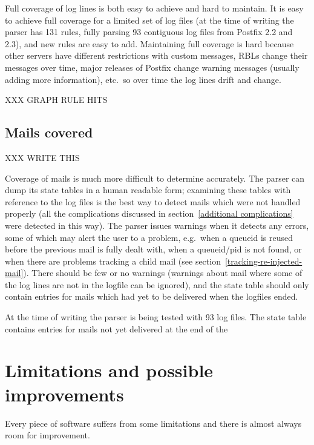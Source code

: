\documentclass[a4paper,12pt,draft]{article}
\begin{document}
Full coverage of log lines is both easy to achieve and hard to maintain.
It is easy to achieve full coverage for a limited set of log files (at the
time of writing the parser has 131 rules, fully parsing 93 contiguous log
files from Postfix 2.2 and 2.3), and new rules are easy to add.
Maintaining full coverage is hard because other servers have different
restrictions with custom messages, RBLs change their messages over time,
major releases of Postfix change warning messages (usually adding more
information), etc.\ so over time the log lines drift and change.

XXX GRAPH RULE HITS

\subsection{Mails covered}

\label{mails-covered}

XXX WRITE THIS

Coverage of mails is much more difficult to determine accurately.  The
parser can dump its state tables in a human readable form; examining these
tables with reference to the log files is the best way to detect mails
which were not handled properly (all the complications discussed in
section~\ref{additional complications} were detected in this way).  The
parser issues warnings when it detects any errors, some of which may alert
the user to a problem, e.g.\ when a queueid is reused before the previous
mail is fully dealt with, when a queueid/pid is not found, or when there
are problems tracking a child mail (see
section~\ref{tracking-re-injected-mail}).  There should be few or no
warnings (warnings about mail where some of the log lines are not in the
logfile can be ignored), and the state table should only contain entries
for mails which had yet to be delivered when the logfiles ended.

At the time of writing the parser is being tested with 93 log files.  The
state table contains entries for mails not yet delivered at the end of the 

\section{Limitations and possible improvements}

\label{limitations-improvements}

Every piece of software suffers from some limitations and there is almost
always room for improvement.
\end{document}
